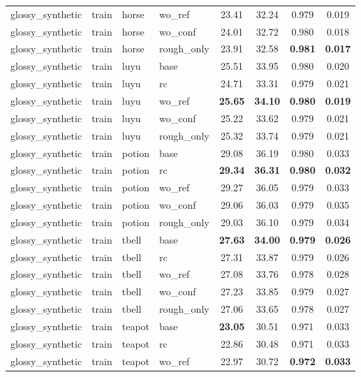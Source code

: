 \begin{table}[t]
{\begin{tabular}{llllcccc}
glossy\_synthetic & train & horse & wo\_ref & 23.41 & 32.24 & 0.979 & 0.019 \\
glossy\_synthetic & train & horse & wo\_conf & 24.01 & 32.72 & 0.980 & 0.018 \\
glossy\_synthetic & train & horse & rough\_only & 23.91 & 32.58 & \textbf{0.981} & \textbf{0.017} \\
glossy\_synthetic & train & luyu & base & 25.51 & 33.95 & 0.980 & 0.020 \\
glossy\_synthetic & train & luyu & rc & 24.71 & 33.31 & 0.979 & 0.021 \\
glossy\_synthetic & train & luyu & wo\_ref & \textbf{25.65} & \textbf{34.10} & \textbf{0.980} & \textbf{0.019} \\
glossy\_synthetic & train & luyu & wo\_conf & 25.22 & 33.62 & 0.979 & 0.021 \\
glossy\_synthetic & train & luyu & rough\_only & 25.32 & 33.74 & 0.979 & 0.021 \\
glossy\_synthetic & train & potion & base & 29.08 & 36.19 & 0.980 & 0.033 \\
glossy\_synthetic & train & potion & rc & \textbf{29.34} & \textbf{36.31} & \textbf{0.980} & \textbf{0.032} \\
glossy\_synthetic & train & potion & wo\_ref & 29.27 & 36.05 & 0.979 & 0.033 \\
glossy\_synthetic & train & potion & wo\_conf & 29.06 & 36.03 & 0.979 & 0.035 \\
glossy\_synthetic & train & potion & rough\_only & 29.03 & 36.10 & 0.979 & 0.034 \\
glossy\_synthetic & train & tbell & base & \textbf{27.63} & \textbf{34.00} & \textbf{0.979} & \textbf{0.026} \\
glossy\_synthetic & train & tbell & rc & 27.31 & 33.87 & 0.979 & 0.026 \\
glossy\_synthetic & train & tbell & wo\_ref & 27.08 & 33.76 & 0.978 & 0.028 \\
glossy\_synthetic & train & tbell & wo\_conf & 27.23 & 33.85 & 0.979 & 0.027 \\
glossy\_synthetic & train & tbell & rough\_only & 27.06 & 33.65 & 0.978 & 0.027 \\
glossy\_synthetic & train & teapot & base & \textbf{23.05} & 30.51 & 0.971 & 0.033 \\
glossy\_synthetic & train & teapot & rc & 22.86 & 30.48 & 0.971 & 0.033 \\
glossy\_synthetic & train & teapot & wo\_ref & 22.97 & 30.72 & \textbf{0.972} & \textbf{0.033} \\

\end{tabular}}
\end{table}

